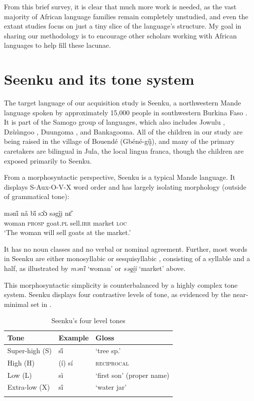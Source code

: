 \documentclass[output=paper,colorlinks,citecolor=brown,
]{langscibook}
\begin{document}
From this brief survey, it is clear that much more work is needed, as the vast majority of African language families remain completely unstudied, and even the extant studies focus on just a tiny slice of the language's structure. My goal in sharing our methodology is to encourage other scholars working with African languages to help fill these lacunae. 


\section{Seenku and its tone system}\label{sec:mcpherson:Seenku}

The target language of our acquisition study is Seenku, a northwestern Mande language spoken by approximately 15,000 people in southwestern Burkina Faso \citep{McPherson20}. It is part of the Samogo group of languages, which also includes Jowulu \citep{Djillaetal04}, Dzùùngoo \citep{Solomiac14}, Duungoma \citep{Hochstetler94}, and Bankagooma. All of the children in our study are being raised in the village of Bouendé (Gbéné-gṵ̏), and many of the primary caretakers are bilingual in Jula, the local lingua franca, though the children are exposed primarily to Seenku.

From a morphosyntactic perspective, Seenku is a typical Mande language. It displays S-Aux-O-V-X word order and has largely isolating morphology (outside of grammatical tone):

\begin{exe}
\ex \gll məni̋ nǎ bi̋ sɔ̋ɔ səgḭ̂ḭ nɛ̏ \\
woman \textsc{prosp} goat.\textsc{pl} sell.\textsc{irr} market \textsc{loc} \\
\glt `The woman will sell goats at the market.' \\
\end{exe}

It has no noun classes and no verbal or nominal agreement. Further, most words in Seenku are either monosyllabic or sesquisyllabic \citep{Matisoff90}, consisting of a syllable and a half, as illustrated by \textit{məni̋} `woman' or \textit{səgḭ̂ḭ} `market' above. 

This morphosyntactic simplicity is counterbalanced by a highly complex tone system. Seenku displays four contrastive levels of tone, as evidenced by the near-minimal set in . 

\begin{table}
    \caption{Seenku's four level tones}
    \label{tab:mcpherson:tonelevels}
    \begin{tabular}{lll}
    \lsptoprule
    Tone & Example & Gloss \\
    \midrule
       Super-high (S)  & si̋ & `tree sp.' \\
       High (H)  & (í) sí & \textsc{reciprocal} \\
       Low (L) & sì & `first son' (proper name) \\
       Extra-low (X) & sȉ & `water jar' \\
       \lspbottomrule
    \end{tabular}
\end{table}
\end{document}
